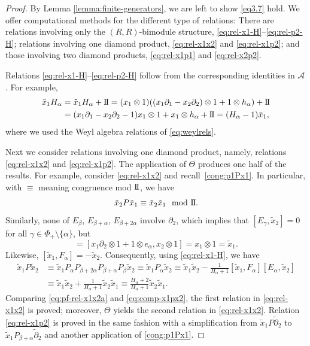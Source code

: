 \documentclass[10pt,a4paper]{amsart}
\numberwithin{equation}{section}
\newcommand{\II}{\mathrm{I\hspace{-.1em}I}}
\begin{document}
\begin{proof}
	By Lemma \ref{lemma:finite-generators}, we are left to show \eqref{eq3.7} hold. We offer computational methods for the different type of relations: There are relations involving only the $(R,R)$-bimodule structure, \eqref{eq:rel-x1-H}--\eqref{eq:rel-p2-H}; relations involving one diamond product, \eqref{eq:rel-x1x2} and \eqref{eq:rel-x1p2}; and those involving two diamond products, \eqref{eq:rel-x1p1} and \eqref{eq:rel-x2p2}.
	
	Relations \eqref{eq:rel-x1-H}--\eqref{eq:rel-p2-H} follow from the corresponding identities in $\mathscr{A}$. For example,
	\begin{align*}
		\bar x_1H_\alpha
		&
		= \tilde x_1H_\alpha+\II
		=(x_1\otimes 1)((x_1\partial_1-x_2\partial_2)\otimes 1+1\otimes h_\alpha)+\II
		\\
		&=(x_1\partial_1-x_2\partial_2-1)x_1\otimes 1+x_1\otimes h_\alpha+\II
		= (H_\alpha-1)\bar x_1,
	\end{align*}
	where we used the Weyl algebra relations of \eqref{eq:weylrels}.
	
	Next we consider relations involving one diamond product, namely, relations \eqref{eq:rel-x1x2} and \eqref{eq:rel-x1p2}. The application of $\Theta$ produces one half of the results. For example, consider \eqref{eq:rel-x1x2} and recall~\eqref{cong:p1Px1}.
	In particular, with $\equiv$ meaning congruence mod $\II$, we have
	\begin{equation}\label{eq:pf-rel-x1x2a}
		\tilde x_2 P \tilde x_1 \equiv \tilde x_2\tilde x_1 \mod{\II}.
	\end{equation}
	Similarly, none of $E_\beta$, $E_{\beta+\alpha}$, $E_{\beta+2\alpha}$ involve $\partial_2$, which implies that
$[E_\gamma, \tilde x_2] = 0$ for all $\gamma\in\Phi_+\setminus\{\alpha\}$,
	but
	\begin{equation*}
		[E_\alpha,\tilde x_2] = [x_1\partial_2\otimes 1+1\otimes e_\alpha, x_2\otimes 1] = x_1\otimes 1=\tilde x_1.
	\end{equation*}
	Likewise,
	$[\tilde x_1, F_\alpha] = -\tilde x_2$.
	Consequently, using \eqref{eq:rel-x1-H}, we have
	\begin{align}
			\tilde x_1 P \tilde x_2 &\equiv \tilde x_1P_\alpha P_{\beta+2\alpha}P_{\beta+\alpha}P_\beta \tilde x_2 \equiv \tilde x_1P_\alpha \tilde x_2
			\equiv \tilde x_1 \tilde x_2 - \frac{1}{H_\alpha+1} [\tilde x_1,F_{\alpha}] [E_{\alpha},\tilde x_2]\nonumber\\
			&\equiv \tilde x_1\tilde x_2 + \frac{1}{H_\alpha+1} \tilde x_2 \tilde x_1
			\equiv \frac{H_\alpha+2}{H_\alpha+1} \tilde x_2\tilde x_1.\label{eq:comp-x1px2}
		\end{align}
	Comparing \eqref{eq:pf-rel-x1x2a} and \eqref{eq:comp-x1px2}, the first relation in \eqref{eq:rel-x1x2} is proved; moreover, $\Theta$ yields the second relation in \eqref{eq:rel-x1x2}. Relation \eqref{eq:rel-x1p2} is proved in the same fashion with a simplification from $\tilde{x}_{1}P\tilde{\partial}_{2}$ to $\tilde{x}_{1}P_{\beta+\alpha}\tilde{\partial}_{2}$ and another application of \eqref{cong:p1Px1}.
	

\end{proof}
\end{document}
